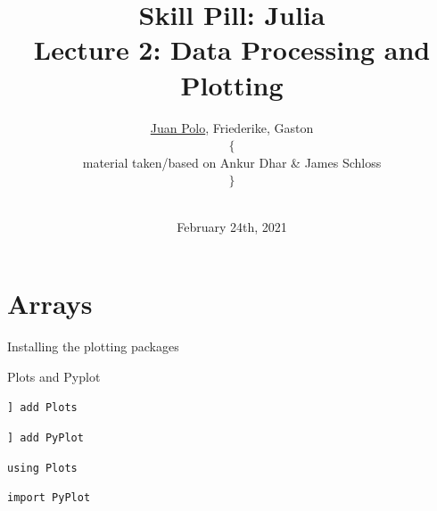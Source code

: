 \documentclass{beamer}
\title[Skill Pill]{
Skill Pill: Julia\\
\small
Lecture 2: Data Processing and Plotting} %
\author[Juan Polo]{\vspace{-0.75cm} \underline{Juan Polo}, Friederike, Gaston {\tiny $\Bigg\{$ \parbox{2cm}{\centering material taken/based on Ankur Dhar \& James Schloss}$\Bigg\}$}} %
\institute[OIST] %
{
	\textit{juan.polo@oist.jp} \\ %
}
\date{\vspace*{-0.5cm}\\ February 24th, 2021} %
\begin{document}

\begin{frame}
\vspace*{1.4cm}
\titlepage %
\end{frame}



\begin{frame}
  \tableofcontents
\end{frame}
\section{Arrays}



\begin{frame}[fragile]{Installing the plotting packages}

\begin{block}{Plots and Pyplot}

{\color{red} \verb|] add Plots|}

{\color{red} \verb|] add PyPlot|}


{\color{red} \verb|using Plots|}

{\color{red} \verb|import PyPlot|}



\end{block}


\end{frame}
\end{document}
